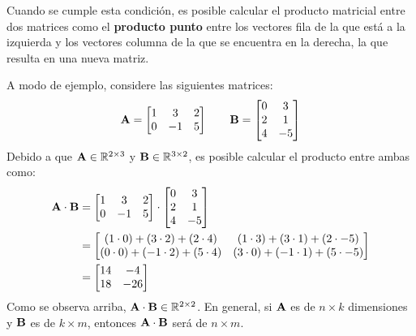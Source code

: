 \documentclass[12pt]{article}
\begin{document}
Cuando se cumple esta condición, es posible calcular el producto matricial entre dos matrices como el \textbf{producto punto} entre los vectores fila de la que está a la izquierda y los vectores columna de la que se encuentra en la derecha, la que resulta en una nueva matriz.

A modo de ejemplo, considere las siguientes matrices:
\[
\mathbf{A} =
\begin{bmatrix}
1 & 3 & 2 \\
0 & -1 & 5
\end{bmatrix}
\qquad
\mathbf{B} =
\begin{bmatrix}
0 & 3 \\
2 & 1 \\
4 & -5
\end{bmatrix}
\]
Debido a que $\mathbf{A} \in \mathbb{R}^{2 \times 3}$ y $\mathbf{B} \in \mathbb{R}^{3 \times 2}$, es posible calcular el producto entre ambas como:
\begin{align*}
\mathbf{A} \cdot \mathbf{B} &=
\begin{bmatrix}
1 & 3 & 2 \\
0 & -1 & 5
\end{bmatrix}
\cdot
\begin{bmatrix}
0 & 3 \\
2 & 1 \\
4 & -5
\end{bmatrix} \\
&=
\begin{bmatrix}
(1 \cdot 0) + (3 \cdot 2) + (2 \cdot 4) & (1 \cdot 3) + (3 \cdot 1) + (2 \cdot -5) \\
(0 \cdot 0) + (-1 \cdot 2) + (5 \cdot 4) & (3 \cdot 0) + (-1 \cdot 1) + (5 \cdot -5)
\end{bmatrix} \\
&=
\begin{bmatrix}
14 & -4 \\
18 & -26
\end{bmatrix}
\end{align*}
Como se observa arriba, $\mathbf{A} \cdot \mathbf{B} \in \mathbb{R}^{2 \times 2}$. En general, si $\mathbf{A}$ es de $n \times k$ dimensiones y $\mathbf{B}$ es de $k \times m$, entonces $\mathbf{A} \cdot \mathbf{B}$ será de $n \times m$.
\end{document}

